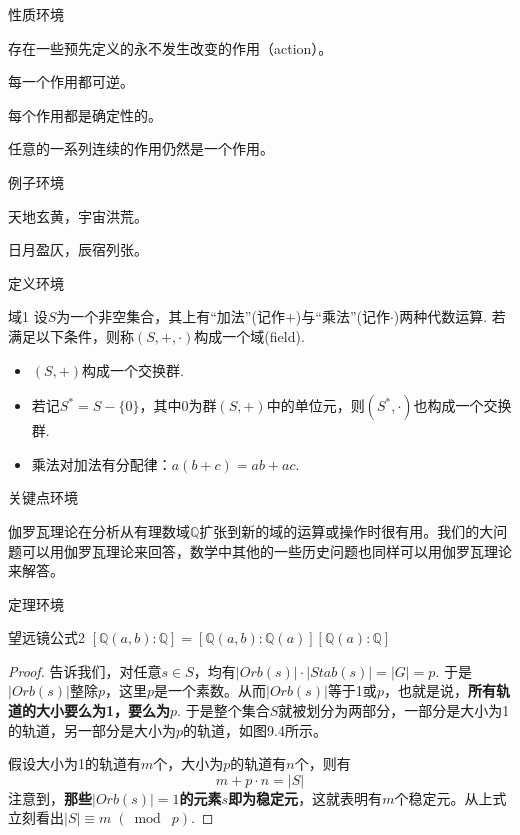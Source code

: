 性质环境
\begin{myprop}{}{}
	存在一些预先定义的永不发生改变的作用（action）。
\end{myprop}

\begin{myprop}{}{}
	每一个作用都可逆。
\end{myprop}

\begin{myprop}{}{}
	每个作用都是确定性的。
\end{myprop}

\begin{myprop}{}{}
	任意的一系列连续的作用仍然是一个作用。
\end{myprop}

例子环境
\begin{example}
	天地玄黄，宇宙洪荒。
	\soln
	
	日月盈仄，辰宿列张。
\end{example}

定义环境
\begin{mydef}{域}{1}
	设$S$为一个非空集合，其上有“加法”(记作$+$)与“乘法”(记作$\cdot$)两种代数运算. 若满足以下条件，则称$(S,+,\cdot)$构成一个域(field).
	\begin{itemize}
		\item[(1)] $(S,+)$构成一个交换群.
		\item[(2)] 若记$S^{*}=S-\{0\}$，其中$0$为群$(S,+)$中的单位元，则$(S^{*},\cdot)$也构成一个交换群.
		\item[(3)] 乘法对加法有分配律：$a ( b + c ) = a b + a c$.
	\end{itemize}
\end{mydef}

关键点环境
\begin{keypoint}
	伽罗瓦理论在分析从有理数域$\mathbb{ Q }$扩张到新的域的运算或操作时很有用。我们的大问题可以用伽罗瓦理论来回答，数学中其他的一些历史问题也同样可以用伽罗瓦理论来解答。
\end{keypoint}

定理环境
\begin{mythm}{望远镜公式}{2}
	$\left[\mathbb{Q}(a, b) : \mathbb{Q}\right]=\left[\mathbb{Q}(a, b) : \mathbb{Q}(a)\right]\left[\mathbb{Q}(a) : \mathbb{Q}\right] $
\end{mythm}

\begin{proof}
	
	告诉我们，对任意$s\in S$，均有$\lvert Orb(s)\rvert \cdot \lvert Stab(s)\rvert=\lvert G\rvert=p$. 于是$\lvert Orb(s)\rvert $整除$p$，这里$p$是一个素数。从而$\lvert Orb(s)\rvert $等于1或$p$，也就是说，\textbf{所有轨道的大小要么为1，要么为$p$}. 于是整个集合$S$就被划分为两部分，一部分是大小为1的轨道，另一部分是大小为$p$的轨道，如图9.4所示。
	
	假设大小为1的轨道有$m$个，大小为$p$的轨道有$n$个，则有
 \begin{equation}
		m+p\cdot n=\lvert S\rvert
 \end{equation}
	注意到，\textbf{那些$\lvert Orb(s)\rvert =1$的元素$s$即为稳定元}，这就表明有$m$个稳定元。从上式立刻看出$\lvert S \rvert \equiv  m\; (\bmod\; p)$.	
\end{proof}

